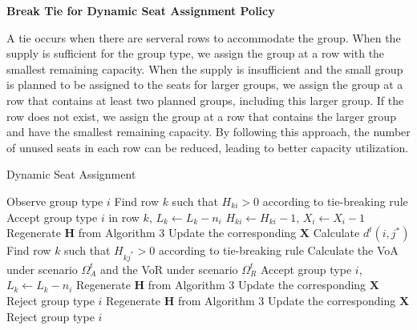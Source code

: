 

{\bf{Break Tie for Dynamic Seat Assignment Policy}}

A tie occurs when there are serveral rows to accommodate the group. When the supply is sufficient for the group type, we assign the group at a row with the smallest remaining capacity. 
When the supply is insufficient and the small group is planned to be assigned to the seats for larger groups, we assign the group at a row that contains at least two planned groups, including this larger group. If the row does not exist, we assign the group at a row that contains the larger group and have the smallest remaining capacity.
By following this approach, the number of unused seats in each row can be reduced, leading to better capacity utilization.


\begin{algorithm}[h]
  \caption{Dynamic Seat Assignment}\label{algo_dynamic_policy}
  { Observe group type $i$\;
    {Find row $k$ such that $H_{ki} >0$ according to tie-breaking rule\; Accept group type $i$ in row $k$, $L_{k} \gets L_{k} -n_{i}$\; $H_{ki} \gets H_{ki} -1$, $X_{i} \gets X_{i} -1$
    {Regenerate $\bm{H}$ from Algorithm 3\; Update the corresponding $\bm{X}$}
    }
    {Calculate $d^{t}(i, j^{*})$\;
    {Find row $k$ such that $H_{kj^{*}} > 0$ according to tie-breaking rule\; 
    Calculate the VoA under scenario $\Omega^{t}_{A}$ and the VoR under scenario $\Omega^{t}_{R}$\;
    {Accept group type $i$, $L_{k} \gets L_{k} - n_{i}$\; Regenerate $\bm{H}$ from Algorithm 3\; Update the corresponding $\bm{X}$\;}
    {Reject group type $i$\; Regenerate $\bm{H}$ from Algorithm 3\; Update the corresponding $\bm{X}$\;}}
    {Reject group type $i$\;}
    }}
\end{algorithm}




